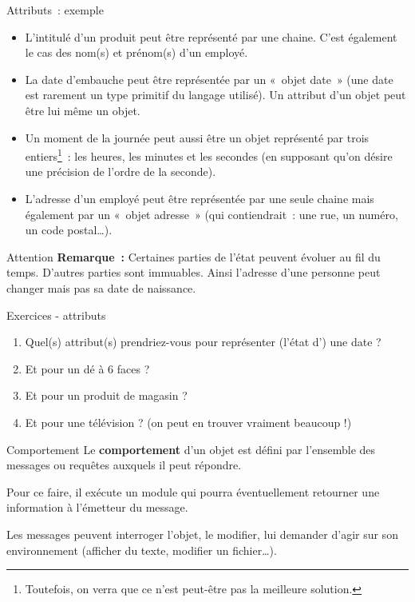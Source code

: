 \begin{frame}{Attributs~: exemple}
	\begin{itemize}
		\item 
			L'intitulé d'un produit peut être
			représenté par une chaine. C'est également le cas des
			nom(s) et prénom(s) d'un employé.
		\item 
			La date d'embauche peut être représentée par un «~objet
			date~» (une date est rarement un type primitif du langage utilisé). Un
			attribut d'un objet peut être lui même un objet.
		\item 
			Un moment de la journée peut aussi être un objet représenté par trois
			entiers\footnote{Toutefois, on verra que ce n'est
			peut-être pas la meilleure solution.}~: les heures, les minutes et les
			secondes (en supposant qu'on désire une précision de
			l'ordre de la seconde).
		\item 
			L'adresse d'un employé peut être
			représentée par une seule chaine mais également par un «~objet
			adresse~» (qui contiendrait~: une rue, un numéro, un code postal\dots).
		\end{itemize}
\end{frame}

\begin{frame}{Attention}
	\textbf{Remarque~: }Certaines parties de
		l'état peuvent évoluer au fil du temps.
		D'autres parties sont immuables. 
		Ainsi l'adresse d'une personne peut changer
		mais pas sa date de naissance.
\end{frame}

\begin{frame}{Exercices - attributs}
	\begin{enumerate}
		\item 
			Quel(s) attribut(s) prendriez-vous pour représenter
			(l'état d') une date ?
		\item 
			Et pour un dé à 6 faces ?
		\item 
			Et pour un produit de magasin ?
		\item 
			Et pour une télévision ?
			(on peut en trouver vraiment beaucoup !)
	\end{enumerate}
\end{frame}

\begin{frame}{Comportement}
	Le \textbf{comportement} d'un objet est défini par
	l'ensemble des messages ou requêtes auxquels il peut répondre.

	Pour ce faire, il exécute un module qui pourra
	éventuellement retourner une information à l'émetteur
	du message.
	
	Les messages peuvent interroger l'objet, le modifier,
	lui demander d'agir sur son environnement (afficher du
	texte, modifier un fichier\dots). 
\end{frame}


